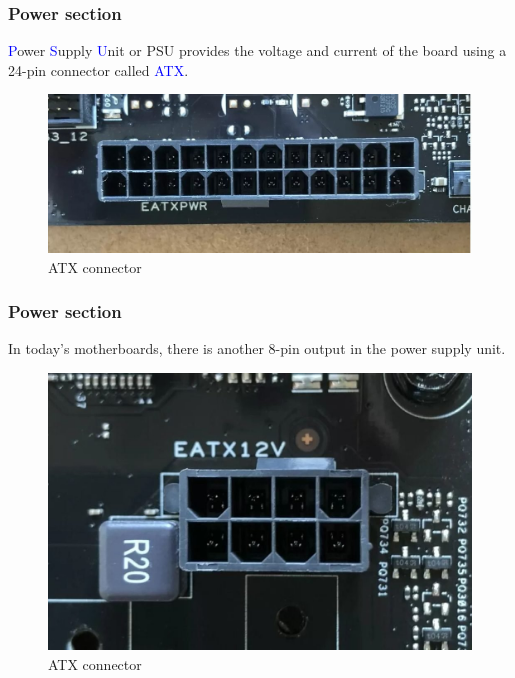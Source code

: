 \documentclass[
	12pt, %
]{beamer}
\begin{document}
\begin{frame}
	\frametitle{Power section}
	\textcolor{blue}{P}ower \textcolor{blue}{S}upply \textcolor{blue}{U}nit or PSU provides the voltage and current of the board using a 24-pin connector called \textcolor{blue}{ATX}.
	
	\begin{figure}
		\centering
		\includegraphics[width=0.8\linewidth]{Images/img10.jpg}
		\caption{ATX connector}
		\label{atx connector}
	\end{figure}
\end{frame}




\begin{frame}
	\frametitle{Power section}
	In today's motherboards, there is another 8-pin output in the power supply unit.
	
	\begin{figure}
		\centering
		\includegraphics[width=0.7\linewidth]{Images/img11.jpg}
		\caption{ATX connector}
		\label{atx8 connector}
	\end{figure}
\end{frame}
\end{document}
